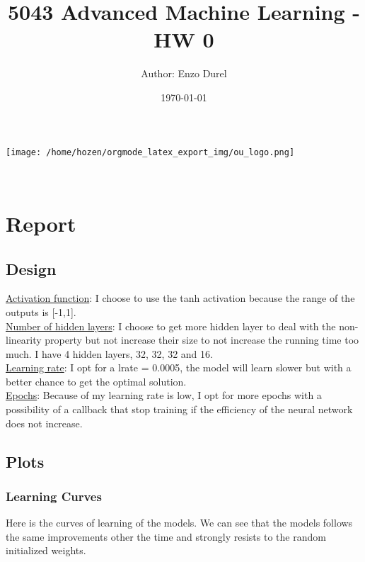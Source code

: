 \documentclass[11pt]{article}
\author{Author: Enzo Durel \newline }
\date{\today}
\title{5043 Advanced Machine Learning - HW 0}
\begin{document}
\maketitle


\begin{center}
\texttt{[image: /home/hozen/orgmode\_latex\_export\_img/ou\_logo.png]}
\end{center}\\[0pt]

\thispagestyle{empty}
\setcounter{tocdepth}{3}
\tableofcontents
\clearpage
{}

\thispagestyle{empty}
\listoffigures
\clearpage
{} 

\newpage

\section{Report}
\label{sec:orgf5347fc}
\subsection{Design}
\label{sec:org40b6519}

\noindent \uline{Activation function}: I choose to use the tanh activation because the range of the outputs is [-1,1].\\[0pt]
\uline{Number of hidden layers}: I choose to get more hidden layer to deal with the non-linearity property but not increase their size to not increase the running time too much. I have 4 hidden layers, 32, 32, 32 and 16.\\[0pt]
\uline{Learning rate}: I opt for a lrate = 0.0005, the model will learn slower but with a better chance to get the optimal solution.\\[0pt]
\uline{Epochs}: Because of my learning rate is low, I opt for more epochs with a possibility of a callback that stop training if the efficiency of the neural network does not increase.\\[0pt]

\subsection{Plots}
\label{sec:org8e5a18f}
\subsubsection{Learning Curves}
\label{sec:org2a6f1e9}

Here is the curves of learning of the models. We can see that the models follows the same improvements other the time and strongly resists to the random initialized weights.\\[0pt]
\end{document}
